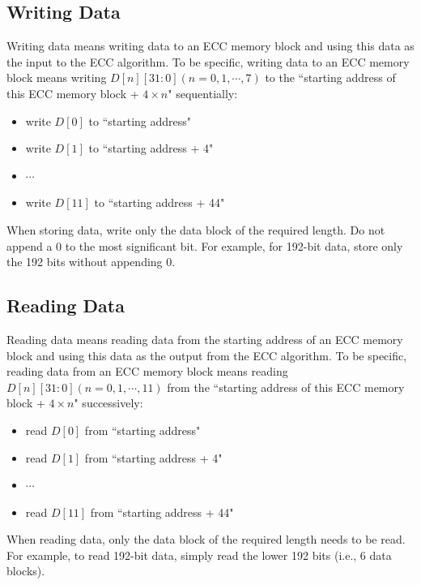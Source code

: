 \documentclass[main\_\_EN.tex]{subfiles}
\begin{document}
\subsection{Writing Data}

Writing data means writing data to an ECC memory block and using this data as the input to the ECC algorithm. To be specific, writing data to an ECC memory block means writing $D[n][31:0] (n=0, 1, \cdots, 7)$ to the ``starting address of this ECC memory block + $4 \times n$" sequentially:

\begin{itemize}
    \item write $D[0]$ to ``starting address"
    \item write $D[1]$ to ``starting address + 4"
    \item $\cdots$
    \item write $D[11]$ to ``starting address + 44"
\end{itemize}

\begin{tiplisting}
When storing data, write only the data block of the required length. Do not append a 0 to the most significant bit. For example, for 192-bit data, store only the 192 bits without appending 0.
\end{tiplisting}

\subsection{Reading Data}

Reading data means reading data from the starting address of an ECC memory block and using this data as the output from the ECC algorithm. To be specific, reading data from an ECC memory block means reading $D[n][31:0] (n=0, 1, \cdots, 11)$ from the ``starting address of this ECC memory block + $4 \times n$" successively:
\begin{itemize}
    \item read $D[0]$ from ``starting address"
    \item read $D[1]$ from ``starting address + 4"
    \item $\cdots$
    \item read $D[11]$ from ``starting address + 44"
\end{itemize}

\begin{tiplisting}
When reading data, only the data block of the required length needs to be read. For example, to read 192-bit data, simply read the lower 192 bits (i.e., 6 data blocks).
\end{tiplisting}
\end{document}

